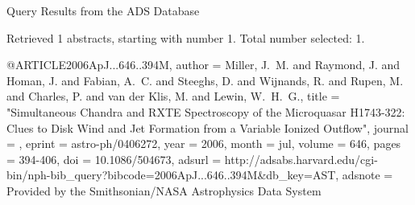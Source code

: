 Query Results from the ADS Database


Retrieved 1 abstracts, starting with number 1.  Total number selected: 1.

@ARTICLE{2006ApJ...646..394M,
   author = {{Miller}, J.~M. and {Raymond}, J. and {Homan}, J. and {Fabian}, A.~C. and 
	{Steeghs}, D. and {Wijnands}, R. and {Rupen}, M. and {Charles}, P. and 
	{van der Klis}, M. and {Lewin}, W.~H.~G.},
    title = "{Simultaneous Chandra and RXTE Spectroscopy of the Microquasar H1743-322: Clues to Disk Wind and Jet Formation from a Variable Ionized Outflow}",
  journal = {\apj},
   eprint = {astro-ph/0406272},
     year = 2006,
    month = jul,
   volume = 646,
    pages = {394-406},
      doi = {10.1086/504673},
   adsurl = {http://adsabs.harvard.edu/cgi-bin/nph-bib_query?bibcode=2006ApJ...646..394M&db_key=AST},
  adsnote = {Provided by the Smithsonian/NASA Astrophysics Data System}
}


